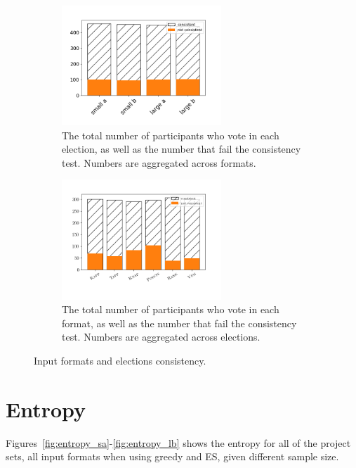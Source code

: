 \documentclass[runningheads]{llncs}
\newcommand{\mes}{ES}
\begin{document}
\begin{figure}[ht!]
     \centering
          \begin{subfigure}[b]{0.45\textwidth}
         \centering
       \includegraphics[width=6cm]{experiment/election_consistency.png}
\caption{The total number of  participants who vote in each election, as well as the number that fail the consistency test.  Numbers are aggregated across formats.
}\label{fig:consistency_elections}
     \end{subfigure}\hfill
     \begin{subfigure}[b]{0.45\textwidth}
         \centering
         \includegraphics[width=6cm]{experiment/format_consistency.png}
\caption{The total number of  participants who vote in each format, as well as the number that fail the consistency test.  Numbers are aggregated across elections.
}\label{fig:consistency}
     \end{subfigure}
        \caption{Input formats and elections consistency.}
        \label{fig:all_consistency}
\end{figure}


\section{Entropy}\label{app:entropy}
Figures~\ref{fig:entropy_sa}-\ref{fig:entropy_lb}  shows the entropy for all of the project sets, all input formats when using greedy and \mes{}, given different sample size. 
\end{document}
